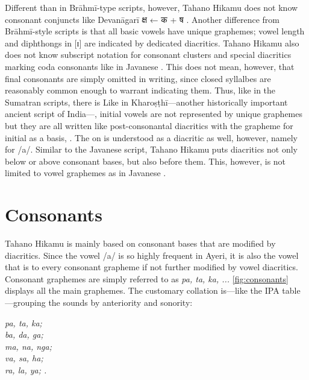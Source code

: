 Different than in Brāhmī-type scripts, however, Tahano Hikamu does not know 
consonant conjuncts like Devanāgarī {\FS क्ष}  ← {\FS क} 
 + {\FS ष} . Another difference from Brāhmī-style scripts is 
that all basic vowels have unique graphemes; vowel length and diphthongs in [ɪ] 
are indicated by dedicated diacritics. Tahano Hikamu also does not know 
subscript notation for consonant clusters and special diacritics marking coda 
consonants like in Javanese \citep[478--479]{kuipersmcdermott1996}. This does 
not mean, however, that final consonants are simply omitted in writing, since 
closed syllalbes are reasonably common enough to warrant indicating them. Thus, 
like in the Sumatran scripts, there is 
 Like in Kharoṣṭhī---another historically important ancient script 
of India---, initial vowels are not represented by unique graphemes but they 
are all written like post-consonantal diacritics with the grapheme for initial 
 as a basis,  \citep[377]{salomon1996}. The  on  is 
understood as a diacritic as well, however, namely for /a/. Similar to the 
Javanese script, Tahano Hikamu puts diacritics not only below or above consonant 
bases, but also before them. This, however, is not limited to vowel graphemes as 
in Javanese \citep[478]{kuipersmcdermott1996}.

\section{Consonants}

Tahano Hikamu is mainly based on consonant bases that are modified by 
diacritics. Since the vowel /a/ is so highly frequent in Ayeri, it is also the 
vowel that is  to every consonant grapheme if not further modified 
by vowel diacritics. Consonant graphemes are simply referred to as \textit{pa, 
ta, ka, ...} \autoref{fig:consonants} displays all the main graphemes. The 
customary collation is---like the IPA table---grouping the sounds by 
anteriority and sonority:

\begin{center}\itshape
	pa, ta, ka;\\
	ba, da, ga;\\
	ma, na, nga;\\
	va, sa, ha;\\
	ra, la, ya;
	.\\
\end{center}

